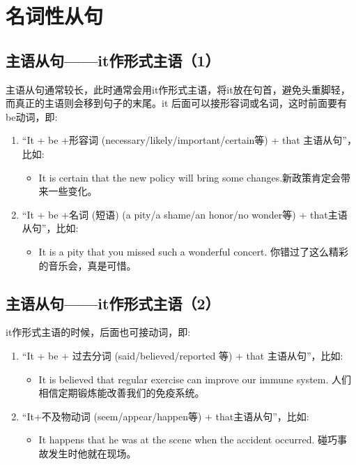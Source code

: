 
\section{名词性从句}

\subsection{主语从句——it作形式主语（1）}

主语从句通常较长，此时通常会用it作形式主语，将it放在句首，避免头重脚轻，而真正的主语则会移到句子的末尾。it 后面可以接形容词或名词，这时前面要有be动词，即:
\begin{enumerate}
  \item “It + be +形容词 (necessary/likely/important/certain等) + that 主语从句”，比如:
        \begin{itemize}
          \item It is certain that the new policy will bring some changes.新政策肯定会带来一些变化。
        \end{itemize}
  \item “It + be +名词 (短语) (a pity/a shame/an honor/no wonder等) + that主语从句”，比如:
        \begin{itemize}
          \item It is a pity that you missed such a wonderful concert. 你错过了这么精彩的音乐会，真是可惜。
        \end{itemize}
\end{enumerate}

\subsection{主语从句——it作形式主语（2）}

it作形式主语的时候，后面也可接动词，即:
\begin{enumerate}
  \item “It + be + 过去分词 (said/believed/reported 等) + that 主语从句”，比如:
        \begin{itemize}
          \item It is believed that regular exercise can improve our immune system. 人们相信定期锻炼能改善我们的免疫系统。
        \end{itemize}
  \item “It+不及物动词 (seem/appear/happen等) + that主语从句”，比如:
        \begin{itemize}
          \item It happens that he was at the scene when the accident occurred. 碰巧事故发生时他就在现场。
        \end{itemize}
\end{enumerate}

